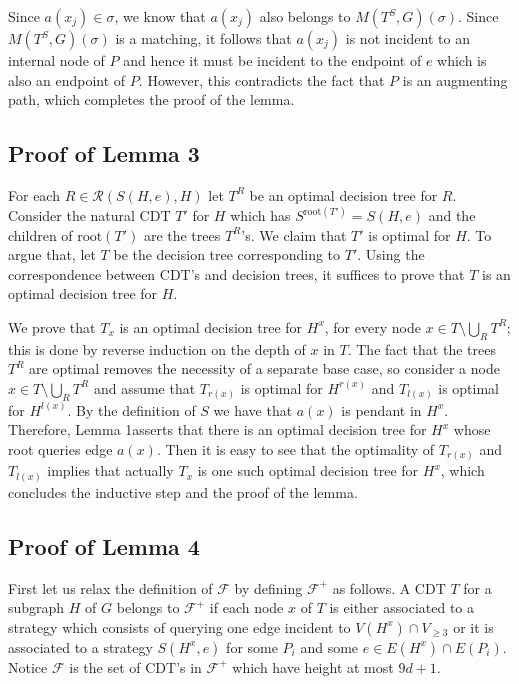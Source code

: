 \documentclass[12pt]{article}
\newcommand{\ro}[1]{\textrm{root}(#1)}
\newcommand{\Mf}[2]{M(#1,#2)}
\newcommand{\pendantFirst}[0]{1}
\begin{document}
		Since $a(x_j) \in \sigma$, we know that $a(x_j)$ also belongs to $\Mf{T^S}{G}(\sigma)$. Since $\Mf{T^S}{G}(\sigma)$ is a matching, it follows that $a(x_j)$ is not incident to an internal node of $P$ and hence it must be incident to the endpoint of $e$ which is also an endpoint of $P$. However, this contradicts the fact that $P$ is an augmenting path, which completes the proof of the lemma.




	\subsection{Proof of Lemma 3} 

		For each $R \in \mathcal{R}(S(H,e), H)$ let $T^R$ be an optimal decision tree for $R$. Consider the natural CDT $T'$ for $H$ which has $S^{\ro{T'}} = S(H,e)$ and the children of $\ro{T'}$ are the trees $T^R$'s. We claim that $T'$ is optimal for $H$. To argue that, let $T$ be the decision tree corresponding to $T'$. Using the correspondence between CDT's and decision trees, it suffices to prove that $T$ is an optimal decision tree for $H$. 		
		
		We prove that $T_x$ is an optimal decision tree for $H^x$, for every node $x \in T \setminus \bigcup_R T^R$; this is done by reverse induction on the depth of $x$ in $T$. The fact that the trees $T^R$ are optimal removes the necessity of a separate base case, so consider a node $x \in T \setminus \bigcup_R T^R$ and assume that $T_{r(x)}$ is optimal for $H^{r(x)}$ and $T_{l(x)}$ is optimal for $H^{l(x)}$. By the definition of $S$ we have that $a(x)$ is pendant in $H^x$. Therefore, Lemma \pendantFirst asserts that there is an optimal decision tree for $H^x$ whose root queries edge $a(x)$. Then it is easy to see that the optimality of $T_{r(x)}$ and $T_{l(x)}$ implies that actually $T_x$ is one such optimal decision tree for $H^x$, which concludes the inductive step and the proof of the lemma.


	\subsection{Proof of Lemma 4}
	
		First let us relax the definition of $\mathcal{F}$ by defining $\mathcal{F}^+$ as follows. A CDT $T$ for a subgraph $H$ of $G$ belongs to $\mathcal{F}^+$ if each node $x$ of $T$ is either associated to a strategy which consists of querying one edge incident to $V(H^x) \cap V_{\ge 3}$ or it is associated to a strategy $S(H^x, e)$ for some $P_i$ and some $e \in E(H^x) \cap E(P_i)$. Notice $\mathcal{F}$ is the set of CDT's in $\mathcal{F}^+$ which have height at most $9d + 1$.
		
\end{document}
